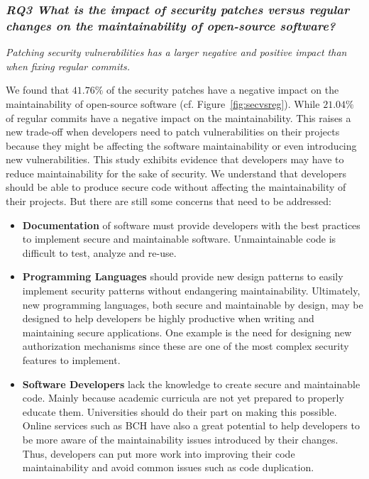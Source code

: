 \documentclass[10pt,conference]{IEEEtran}
\begin{document}
\subsubsection*{\textit{\textbf{RQ3} \textbf{What is the impact of security patches versus regular changes
on the maintainability of open-source software?}}}
\textit{Patching security vulnerabilities has a larger negative and positive impact
than when fixing regular commits.}

We found that $41.76\%$ of the security patches have a negative impact on the
maintainability of open-source software (cf. Figure~\ref{fig:secvsreg}). While $21.04\%$ of regular commits have a negative impact on the maintainability. This raises
a new trade-off when developers need to patch vulnerabilities on their projects
because they might be affecting the software maintainability or even introducing
new vulnerabilities. This study exhibits evidence that developers may have to
reduce maintainability for the sake of security. We understand that developers
should be able to produce secure code without affecting the maintainability of
their projects. But there are still some concerns that need to be addressed:
\begin{itemize}
	\item \textbf{Documentation} of software must provide developers with the
	best practices to implement secure and maintainable software. Unmaintainable
	code is difficult to test, analyze and re-use.

	\item\textbf{Programming Languages} should provide new design patterns to
	easily implement security patterns without endangering maintainability.
	Ultimately, new programming languages, both secure and maintainable by design,
	may be designed to help developers be highly productive when writing and
	maintaining  secure applications. One example is the need for designing new
	authorization mechanisms since these are one of the most complex security
	features to implement.

	\item \textbf{Software Developers} lack the knowledge to create secure and
	maintainable code. Mainly because academic curricula are not yet prepared
	to properly educate them. Universities should do their part on making
	this possible. Online services such as BCH have also a great potential to help
	developers to be more aware of the maintainability issues introduced by their
	changes. Thus, developers can put more work into improving their code maintainability
	and avoid common issues such as code duplication.

\end{itemize}
\end{document}
